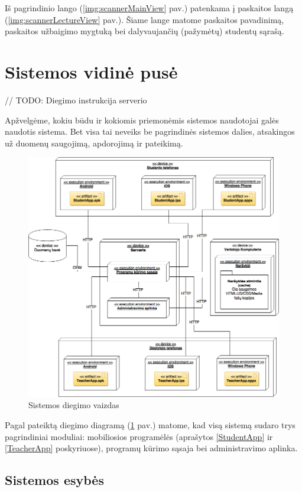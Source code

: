 \documentclass{VUMIFPSkursinis}
\begin{document}
Iš pagrindinio lango (\ref{img:scannerMainView} pav.) patenkama į paskaitos langą (\ref{img:scannerLectureView} pav.). Šiame lange matome paskaitos pavadinimą, paskaitos užbaigimo mygtuką bei dalyvaujančių (pažymėtų) studentų sąrašą.

\section{Sistemos vidinė pusė}

// TODO: Diegimo instrukcija serverio

Apžvelgėme, kokiu būdu ir kokiomis priemonėmis sistemos naudotojai galės naudotis sistema. Bet visa tai neveiks be pagrindinės sistemos dalies, atsakingos už duomenų saugojimą, apdorojimą ir pateikimą.

\begin{figure}[H]
	\centering
	\includegraphics[scale=0.5]{img/kursinio_deployment.png}
	\caption{Sistemos diegimo vaizdas}
	\label{img:deployment}
\end{figure}

Pagal pateiktą diegimo diagramą (\ref{img:deployment} pav.) matome, kad visą sistemą sudaro trys pagrindiniai moduliai: mobiliosios programėlės (aprašytos \ref{StudentApp} ir \ref{TeacherApp} poskyriuose), programų kūrimo sąsaja bei administravimo aplinka.

\subsection{Sistemos esybės}
\end{document}
